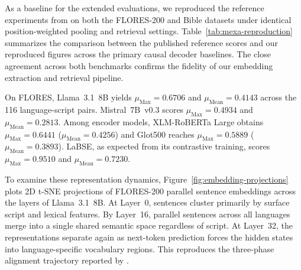 As a baseline for the extended evaluations, we reproduced the reference experiments from \citet{kargaran2025mexa} on both the FLORES-200 and Bible datasets under identical position-weighted pooling and retrieval settings. Table~\ref{tab:mexa-reproduction} summarizes the comparison between the published reference scores and our reproduced figures across the primary causal decoder baselines. The close agreement across both benchmarks confirms the fidelity of our embedding extraction and retrieval pipeline.

\begin{table}[t]
\centering
\small
{}
\caption{\textbf{Reproduction of reference MEXA alignment scores ($\mu_{\text{Max}} / \mu_{\text{Mean}}$)}. Comparison between published values from \citet{kargaran2025mexa} and our reproduced results on the FLORES ($n = 100$) and Bible ($n = 103$) benchmarks.}
\label{tab:mexa-reproduction}
\end{table}

On FLORES, Llama~3.1~8B yields $\mu_{\text{Max}} = 0.6706$ and $\mu_{\text{Mean}} = 0.4143$ across the 116 language-script pairs. Mistral~7B~v0.3 scores $\mu_{\text{Max}} = 0.4934$ and $\mu_{\text{Mean}} = 0.2813$. Among encoder models, XLM-RoBERTa Large obtains $\mu_{\text{Max}} = 0.6441$ ($\mu_{\text{Mean}} = 0.4256$) and Glot500 reaches $\mu_{\text{Max}} = 0.5889$ ($\mu_{\text{Mean}} = 0.3893$). LaBSE, as expected from its contrastive training, scores $\mu_{\text{Max}} = 0.9510$ and $\mu_{\text{Mean}} = 0.7230$.

To examine these representation dynamics, Figure~\ref{fig:embedding-projections} plots 2D t-SNE projections of FLORES-200 parallel sentence embeddings across the layers of Llama~3.1~8B. At Layer~0, sentences cluster primarily by surface script and lexical features. By Layer~16, parallel sentences across all languages merge into a single shared semantic space regardless of script. At Layer~32, the representations separate again as next-token prediction forces the hidden states into language-specific vocabulary regions. This reproduces the three-phase alignment trajectory reported by \citet{kargaran2025mexa}.

